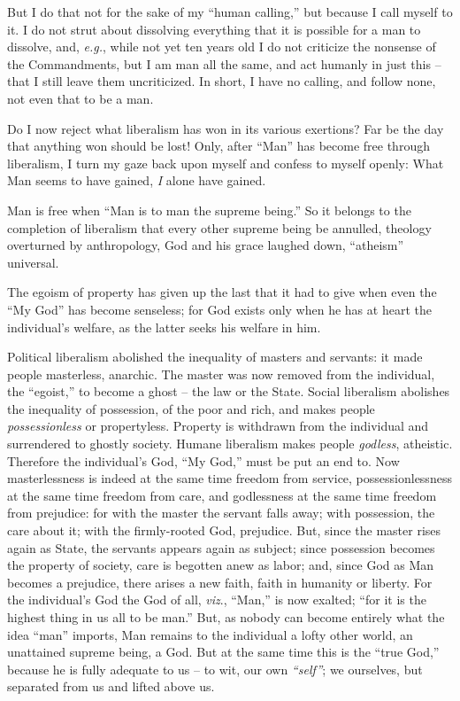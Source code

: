 \documentclass[12pt,a4paper]{book}
\begin{document}
But I do that not for the sake of my ``human calling,'' but because I call 
myself to it. I do not strut about dissolving everything that it is possible 
for a man to dissolve, and, \textit{e.g.}, while not yet ten years old I do 
not criticize the nonsense of the Commandments, but I am man all the same, and 
act humanly in just this -- that I still leave them uncriticized. In short, I 
have no calling, and follow none, not even that to be a man.

Do I now reject what liberalism has won in its various exertions? Far be the 
day that anything won should be lost! Only, after ``Man'' has become free 
through liberalism, I turn my gaze back upon myself and confess to myself 
openly: What Man seems to have gained, \textit{I} alone have gained.

Man is free when ``Man is to man the supreme being.'' So it belongs to the 
completion of liberalism that every other supreme being be annulled, theology 
overturned by anthropology, God and his grace laughed down, ``atheism'' 
universal.

The egoism of property has given up the last that it had to give when even the 
``My God'' has become senseless; for God exists only when he has at heart 
the individual's welfare, as the latter seeks his welfare in him.

Political liberalism abolished the inequality of masters and servants: it made 
people masterless, anarchic. The master was now removed from the individual, 
the ``egoist,'' to become a ghost -- the law or the State. Social liberalism 
abolishes the inequality of possession, of the poor and rich, and makes people 
\textit{possessionless} or propertyless. Property is withdrawn from the 
individual and surrendered to ghostly society. Humane liberalism makes people 
\textit{godless}, atheistic. Therefore the individual's God, ``My God,'' 
must be put an end to. Now masterlessness is indeed at the same time freedom 
from service, possessionlessness at the same time freedom from care, and 
godlessness at the same time freedom from prejudice: for with the master the 
servant falls away; with possession, the care about it; with the firmly-rooted 
God, prejudice. But, since the master rises again as State, the servants 
appears again as subject; since possession becomes the property of society, 
care is begotten anew as labor; and, since God as Man becomes a prejudice, 
there arises a new faith, faith in humanity or liberty. For the individual's 
God the God of all, \textit{viz}., ``Man,'' is now exalted; ``for it is the 
highest thing in us all to be man.'' But, as nobody can become entirely what 
the idea ``man'' imports, Man remains to the individual a lofty other world, 
an unattained supreme being, a God. But at the same time this is the ``true 
God,'' because he is fully adequate to us -- to wit, our own 
\textit{``self''}; we ourselves, but separated from us and lifted above us.
\end{document}
